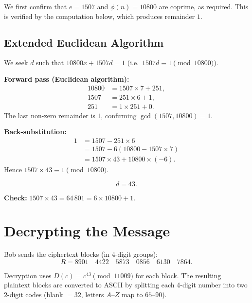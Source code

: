 We first confirm that $e = 1507$ and $\phi(n) = 10800$ are coprime, as required.
This is verified by the computation below, which produces remainder $1$.

\subsection{Extended Euclidean Algorithm}

We seek $d$ such that $10800x + 1507d = 1$ (i.e.\ $1507d \equiv 1 \pmod{10800}$).

\textbf{Forward pass (Euclidean algorithm):}
\begin{align*}
    10800 &= 1507 \times 7 + 251, \\
    1507  &= 251  \times 6 + 1, \\
    251   &= 1    \times 251 + 0.
\end{align*}
The last non-zero remainder is $1$, confirming $\gcd(1507, 10800) = 1$.

\textbf{Back-substitution:}
\begin{align*}
    1 &= 1507 - 251 \times 6 \\
      &= 1507 - 6(10800 - 1507 \times 7) \\
      &= 1507 \times 43 + 10800 \times (-6).
\end{align*}
Hence $1507 \times 43 \equiv 1 \pmod{10800}$.

\[
    \boxed{d = 43.}
\]

\textbf{Check:} $1507 \times 43 = 64\,801 = 6 \times 10800 + 1$. \checkmark

\section{Decrypting the Message}

Bob sends the ciphertext blocks (in 4-digit groups):
\[
    R = 8901 \quad 4422 \quad 5873 \quad 0856 \quad 6130 \quad 7864.
\]

Decryption uses $D(c) = c^{43} \pmod{11009}$ for each block. The resulting
plaintext blocks are converted to ASCII by splitting each 4-digit number into
two 2-digit codes (blank $= 32$, letters $A$--$Z$ map to $65$--$90$).

